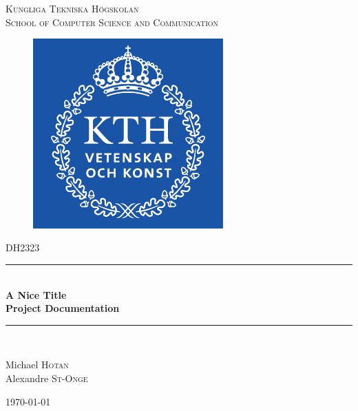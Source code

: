 \documentclass{scrartcl}
\newcommand{\HRule}{\rule{\linewidth}{0.5mm}}
\begin{document}

\begin{titlepage}
\begin{center}


\textsc{ Kungliga Tekniska Högskolan \\ School of Computer Science and Communication}\\[1.5cm]

\begin{figure}[ht]
\begin{center}
\includegraphics[width=0.65\textwidth]{KTH}
\end{center}
\end{figure}

\textsc{\Large DH2323}\\[0.5cm]

\HRule \\[0.4cm]
 { \huge \bfseries A Nice Title \\[0.4cm] }
{\large \bfseries  Project Documentation\\[0.4cm] }

\HRule \\[1.5cm]

\begin{minipage}{0.65\textwidth}
\begin{flushleft} \large
Michael \textsc{Hotan} \\
Alexandre \textsc{St-Onge}\\
\end{flushleft}
\end{minipage}

\vfill

{\large \today}

\end{center}
\end{titlepage}
\end{document}
